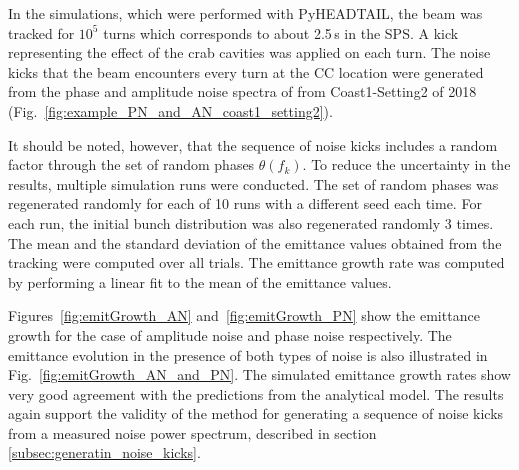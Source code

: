In the simulations, which were performed with PyHEADTAIL, the beam was tracked for $10^5$ turns which corresponds to about 2.5\,s in the SPS. A kick representing the effect of the crab cavities was applied on each turn. The noise kicks that the beam encounters every turn at the CC location were generated from the phase and amplitude noise spectra of from Coast1-Setting2 of 2018 (Fig.~\ref{fig:example_PN_and_AN_coast1_setting2}). 

It should be noted, however, that the sequence of noise kicks includes a random factor through the set of random phases $\theta(f_k)$. To reduce the uncertainty in the results, multiple simulation runs were conducted. The set of random phases was regenerated randomly for each of 10 runs with a different seed each time. For each run, the initial bunch distribution was also regenerated randomly 3 times. The mean and the standard deviation of the emittance values obtained from the tracking were computed over all trials. The emittance growth rate was computed by performing a linear fit to the mean of the emittance values.

Figures~\ref{fig:emitGrowth_AN} and~\ref{fig:emitGrowth_PN} show the emittance growth for the case of amplitude noise and phase noise respectively. The emittance evolution in the presence of both types of noise is also illustrated in Fig.~\ref{fig:emitGrowth_AN_and_PN}. The simulated emittance growth rates show very good agreement with the predictions from the analytical model. The results again support the validity of the method for generating a sequence of noise kicks from a measured noise power spectrum, described in section \ref{subsec:generatin_noise_kicks}.


